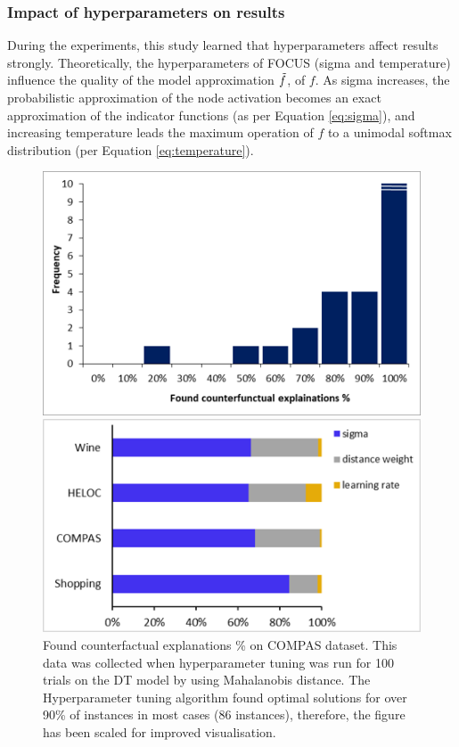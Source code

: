 \subsubsection{Impact of hyperparameters on results}
\label{sec:effect of hyperparameters}
During the experiments, this study learned that hyperparameters affect results strongly. Theoretically, the hyperparameters of FOCUS (sigma and temperature) influence the quality of the model approximation $\Tilde{f}$, of $f$. As sigma increases, the probabilistic approximation of the node activation becomes an exact approximation of the indicator functions (as per Equation \ref{eq:sigma}), and increasing temperature leads the maximum operation of $f$ to a unimodal softmax distribution (per Equation \ref{eq:temperature}).

\begin{figure}[]
 \begin{minipage}{0.475\linewidth}
  \centering
  \includegraphics[width=\linewidth]{images/cfe_hist.png}
  \caption{Found counterfactual explanations \% on COMPAS dataset. This data was collected when hyperparameter tuning was run for 100 trials on the DT model by using Mahalanobis distance. The Hyperparameter tuning algorithm found optimal solutions for over 90\% of instances in most cases (86 instances), therefore, the figure has been scaled for improved visualisation.}
  \label{fig:cfe-hist}
 \end{minipage}\hfill
 \begin{minipage}{0.475\linewidth}
  \centering
  \includegraphics[width=\linewidth]{images/hparams_importance.png}

\end{minipage}
\end{figure}
